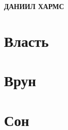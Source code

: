 \documentclass[12pt,a4paper]{book}
\begin{document}
\begin{center}
\Large\textbf{ДАНИИЛ ХАРМС}
\end{center}

\chapter*{Власть}


\chapter*{Врун}


\chapter*{Сон}

\end{document}
